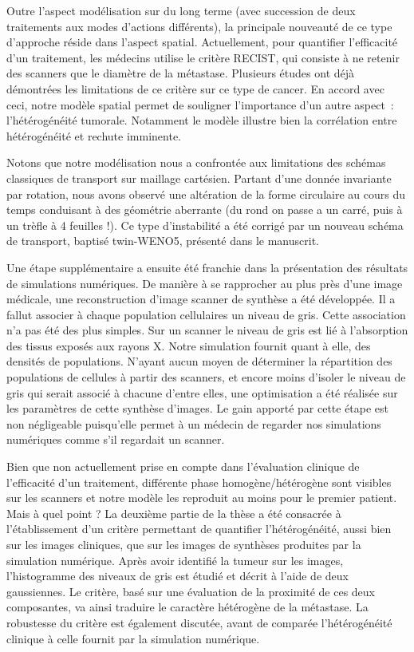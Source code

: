 \documentclass[12pt,a4paper]{article}
\newcommand{\hetero}{hétérogénéité\xspace}
\newcommand{\heterogene}{hétérogène\xspace}
\newcommand{\twinweno}{twin-WENO5\xspace}
\begin{document}
Outre l'aspect modélisation sur du long terme (avec succession de deux traitements aux modes d'actions différents), la principale nouveauté de ce type d'approche réside dans l'aspect spatial. Actuellement, pour quantifier l'efficacité d'un traitement, les médecins utilise le critère RECIST, qui consiste à ne retenir des scanners que le diamètre de la métastase. Plusieurs études ont déjà démontrées les limitations de ce critère sur ce type de cancer. En accord avec ceci, notre modèle spatial permet de souligner l'importance d'un autre aspect~: l'\hetero tumorale. Notamment le modèle illustre bien la corrélation entre \hetero et rechute imminente.



Notons que notre modélisation nous a confrontée aux limitations des schémas classiques de transport sur maillage cartésien. Partant d'une donnée invariante par rotation, nous avons observé une altération de la forme circulaire au cours du temps conduisant à des géométrie aberrante (du rond on passe a un carré, puis à un trèfle à 4 feuilles !). Ce type d'instabilité a été corrigé par un nouveau schéma de transport, baptisé \twinweno, présenté dans le manuscrit.


Une étape supplémentaire a ensuite été franchie dans la présentation des résultats de simulations numériques. De manière à se rapprocher au plus près d'une image médicale,  une reconstruction d'image scanner de synthèse a été développée. Il a fallut associer à chaque population cellulaires un niveau de gris. Cette association n'a pas été des plus simples. Sur un scanner le niveau de gris est lié à l'absorption des tissus exposés aux rayons X. Notre simulation fournit quant à elle, des densités de populations. N'ayant aucun moyen de déterminer la répartition des populations de cellules à partir des scanners, et encore moins d'isoler le niveau de gris qui serait associé à chacune d'entre elles, une optimisation a été réalisée sur les paramètres de cette synthèse d'images. Le gain apporté par cette étape est non négligeable puisqu'elle permet à un médecin de regarder nos simulations numériques comme s'il regardait un scanner. 


Bien que non actuellement prise en compte dans l'évaluation clinique de l'efficacité d'un traitement, différente phase homogène/\heterogene sont visibles sur les scanners et notre modèle les reproduit au moins pour le premier patient. Mais à quel point ? La deuxième partie de la thèse a été consacrée à l'établissement d'un critère permettant de quantifier l'\hetero, aussi bien sur les images cliniques, que sur les images de synthèses produites par la simulation numérique. Après avoir identifié la tumeur sur les images, l'histogramme des niveaux de gris est étudié et décrit à l'aide de deux gaussiennes. Le critère, basé sur une évaluation de la proximité de ces deux composantes, va ainsi traduire le caractère \heterogene de la métastase. La robustesse du critère est également discutée, avant de comparée l'\hetero clinique à celle fournit par la simulation numérique. 
\end{document}
